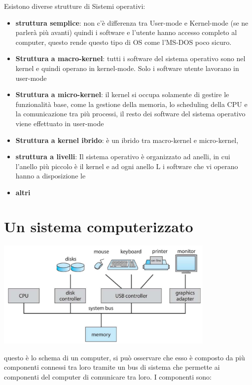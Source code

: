 \documentclass{article}
\begin{document}
    Esistono diverse strutture di Sistemi operativi:
            \begin{itemize}
                \item \textbf{struttura semplice}:
                    non c'è differenza tra User-mode e Kernel-mode (se ne parlerà più avanti) quindi i software e l'utente hanno accesso completo al computer, questo rende questo tipo di OS come l'MS-DOS poco sicuro.
                \item \textbf{Struttura a macro-kernel}:
                    tutti i software del sistema operativo sono nel kernel e quindi operano in kernel-mode. Solo i software utente lavorano in user-mode
                \item \textbf{Struttura a micro-kernel}:
                    il kernel si occupa solamente di gestire le funzionalità base, come la gestione della memoria, lo scheduling della CPU e la comunicazione tra più processi, il resto dei software del sistema operativo viene effettuato in user-mode
                \item \textbf{Struttura a kernel ibrido}:
                    è un ibrido tra macro-kernel e micro-kernel,
                \item \textbf{struttura a livelli}:
                Il sistema operativo è organizzato ad anelli, in cui l'anello più piccolo è il kernel e ad ogni anello L i software che vi operano hanno a disposizione le 
                \item \textbf{altri}
            \end{itemize}

\newpage

\section{Un sistema computerizzato}

    \begin{center}
    \includegraphics[width=0.8\textwidth]{immagini/immagine.png}
    \end{center}
    questo è lo schema di un computer, si può osservare che esso è composto da più componenti connessi tra loro tramite un bus di sistema che permette ai componenti del computer di comunicare tra loro. I componenti sono:
\end{document}
